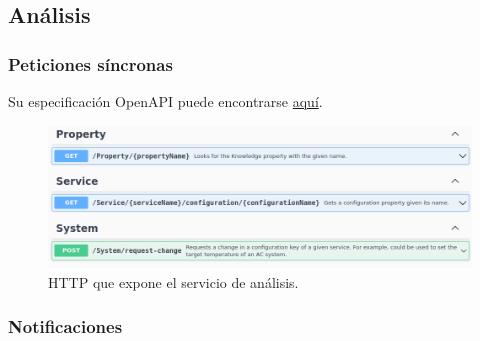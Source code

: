 \subsection{Análisis}

\subsubsection{Peticiones síncronas}

Su especificación OpenAPI puede encontrarse \href{https://github.com/Starkie/TFM-DistributedAutoadaptiveSystems/blob/1db95346290cb55edbfd5efb717785bcd06def79/src/AutoAdaptativeSystem/AdaptionLoop/Analysis/Analysis.Service-OpenAPISpec.json}{aquí}.

\begin{figure}[h!]
  \hspace{-0.25cm}
  \includegraphics[scale=0.45]{anx_apis/images/apis-analysis}
  \caption{ HTTP que expone el servicio de análisis.}
\end{figure}

\subsubsection{Notificaciones}

